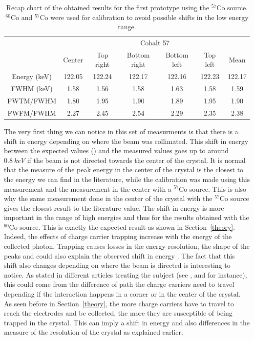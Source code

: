 \documentclass[11pt,a4paper]{article}
\begin{document}
\begin{table}[!h]
\centering
\caption{Recap chart of the obtained results for the first prototype using the $^{57}$Co source. $^{60}$Co and $^{57}$Co were used for calibration to avoid possible shifts in the low energy range.}
\label{recap57}
\begin{tabular}{c|c|c|c|c|c|c|}
\cline{2-7}
                                   & \multicolumn{6}{c|}{Cobalt 57}                                      \\ \cline{2-7} 
                                   & Center & Top right & Bottom right & Bottom left & Top left & Mean   \\ \hline
\multicolumn{1}{|c|}{Energy (keV)} & 122.05 & 122.24    & 122.17       & 122.16      & 122.23   & 122.17 \\ \hline
\multicolumn{1}{|c|}{FWHM (keV)}   & 1.58   & 1.56      & 1.58         & 1.63        & 1.58     & 1.59   \\ \hline
\multicolumn{1}{|c|}{FWTM/FWHM}    & 1.80   & 1.95      & 1.90         & 1.89        & 1.95     & 1.90   \\ \hline
\multicolumn{1}{|c|}{FWFM/FWHM}    & 2.27   & 2.45      & 2.54         & 2.29        & 2.35     & 2.38   \\ \hline
\end{tabular}
\end{table}

The very first thing we can notice in this set of measurments is that there is a shift in energy depending on where the beam was collimated. This shift in energy between the expected values (\cite{lit}) and the measured values goes up to around $0.8~keV$ if the beam is not directed towards the center of the crystal. It is normal that the measure of the peak energy in the center of the crystal is the closest to the energy we can find in the literature, while the calibration was made using this measurement and the measurement in the center with a $^{57}$Co source. This is also why the same measurement done in the center of the crystal with the $^{57}$Co source gives the closest result to the literature value. The shift in energy is more important in the range of high energies and thus for the results obtained with the $^{60}$Co source. This is exactly the expected result as shown in Section~\ref{theory}. Indeed, the effects of charge carrier trapping increase with the energy of the collected photon. Trapping causes losses in the energy resolution, the shape of the peaks and could also explain the observed shift in energy \cite{Trammell}. The fact that this shift also changes depending on where the beam is directed is interesting to notice. As stated in different articles treating the subject (see \cite{Trammell}, \cite{Martini} and \cite{Raudorf} for instance), this could come from the difference of path the charge carriers need to travel depending if the interaction happens in a corner or in the center of the crystal. As seen before in Section~\ref{theory}, the more charge carriers have to travel to reach the electrodes and be collected, the more they are susceptible of being trapped in the crystal. This can imply a shift in energy and also differences in the measure of the resolution of the crystal as explained earlier.
\end{document}
